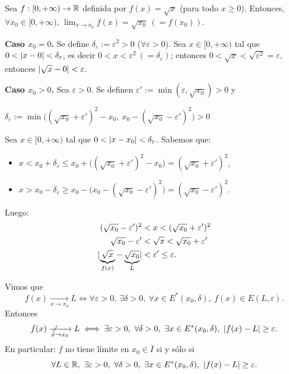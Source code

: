 \documentclass[11pt,a4paper]{article}
\newcommand{\Er}{E^{*}}                 %
\newcommand{\Cl}[1]{\overline{#1}}      %
\begin{document}
\begin{ejemplo}
Sea $f:[0,+\infty)\to\mathbb{R}$ definida por $f(x)=\sqrt{x}$ (para todo $x\geq 0$). Entonces, $\forall x_0\in[0,+\infty)$, $\displaystyle\lim_{x\to x_0}f(x)=\sqrt{x_0}\ (=f(x_0))$.

\textbf{Caso $x_0=0$.} Se define $\delta_\varepsilon:=\varepsilon^2>0$ ($\forall\varepsilon>0$). Sea $x\in[0,+\infty)$ tal que $0<\lvert x-0\rvert<\delta_\varepsilon$, es decir $0<x<\varepsilon^2\ (=\delta_\varepsilon)$; entonces $0<\sqrt{x}<\sqrt{\varepsilon^2}=\varepsilon$, entonces $\lvert\sqrt{x}-0\rvert<\varepsilon$.

\textbf{Caso $x_0>0$.} Sea $\varepsilon>0$. Se definen $\varepsilon':=\min(\varepsilon,\sqrt{x_0})>0$ y
\begin{center}
$\displaystyle\delta_\varepsilon := \min\Big( (\sqrt{x_0}+\varepsilon')^2-x_0,\ x_0-(\sqrt{x_0}-\varepsilon')^2 \Big) > 0$
\end{center}
Sea $x\in[0,+\infty)$ tal que $0<\lvert x-x_0\rvert<\delta_\varepsilon$. Sabemos que:
\begin{itemize}
  \item $x < x_0+\delta_\varepsilon \leq x_0 + \big((\sqrt{x_0}+\varepsilon')^2-x_0\big) = (\sqrt{x_0}+\varepsilon')^2$,
  \item $x > x_0-\delta_\varepsilon \geq x_0 - \big(x_0-(\sqrt{x_0}-\varepsilon')^2\big) = (\sqrt{x_0}-\varepsilon')^2$.
\end{itemize}
Luego:
\begin{align*}
  (\sqrt{x_0}-\varepsilon')^2 &< x < (\sqrt{x_0}+\varepsilon')^2\\
  \sqrt{x_0}-\varepsilon' &< \sqrt{x} < \sqrt{x_0}+\varepsilon'\\
  \lvert\underbrace{\sqrt{x}}_{f(x)}-\underbrace{\sqrt{x_0}}_{L}\rvert &< \varepsilon' \leq \varepsilon.
\end{align*}
\end{ejemplo}

\begin{observacion}
Vimos que
\[
  f(x)\xrightarrow[x\to x_0]{}L \iff \forall\varepsilon>0,\ \exists\delta>0,\ \forall x\in\Er(x_0,\delta),\ f(x)\in E(L,\varepsilon).
\]
Entonces
\[
  f(x)\ \not\!\!\xrightarrow[x\to x_0]{}L \iff \exists\varepsilon>0,\ \forall\delta>0,\ \exists x\in\Er(x_0,\delta),\ \abs{f(x)-L}\geq\varepsilon.
\]
En particular: $f$ no tiene límite en $x_0\in\Cl{I}$ si y sólo si
\[
  \forall L\in\R,\ \exists\varepsilon>0,\ \forall\delta>0,\ \exists x\in\Er(x_0,\delta),\ \abs{f(x)-L}\geq\varepsilon.
\]
\end{observacion}
\end{document}
